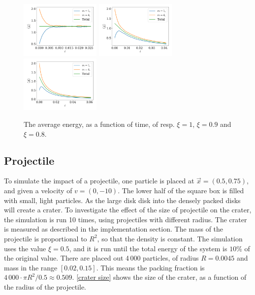 \documentclass{article}
\begin{document}
    \begin{figure}[H]
        \centering
        \hspace{-5mm}
        \includegraphics[width=0.35\textwidth]{../plots/problem3/xi_0/energy_ex3.pdf}
        \hspace{-4mm}
        \includegraphics[width=0.35\textwidth]{../plots/problem3/xi_1/energy_ex3.pdf}
        \hspace{-4mm}
        \includegraphics[width=0.35\textwidth]{../plots/problem3/xi_2/energy_ex3.pdf}
        \hspace{-5mm}
        \caption{The average energy, as a function of time, of resp.
        $\xi=1$, $\xi=0.9$ and $\xi=0.8$.}
        \label{problem2 av en}
    \end{figure}

    \subsection*{Projectile}
    To simulate the impact of a projectile, one particle is placed at $\vec x = (0.5, 0.75)$, and given a velocity of $v = (0, -10)$.
    The lower half of the square box is filled with small, light particles.
    As the large disk  disk into the densely packed disks will create a crater.
    To investigate the effect of the size of projectile on the crater, the simulation is run 10 times, using projectiles with different radius.
    The crater is measured as described in the implementation section.
    The mass of the projectile is proportional to $R^2$, so that the density is constant.
    The simulation uses the value $\xi = 0.5$, and it is run until the total energy of the system is $10\%$ of the original value.
    There are placed out 4\,000 particles, of radius $R=0.0045$ and mass in the range $[0.02, 0.15]$.
    This means the packing fraction is $4\,000 \cdot \pi R^2 / 0.5 \approx 0.509$.
    \autoref{crater size} shows the size of the crater, as a function of the radius of the projectile.
    
\end{document}

